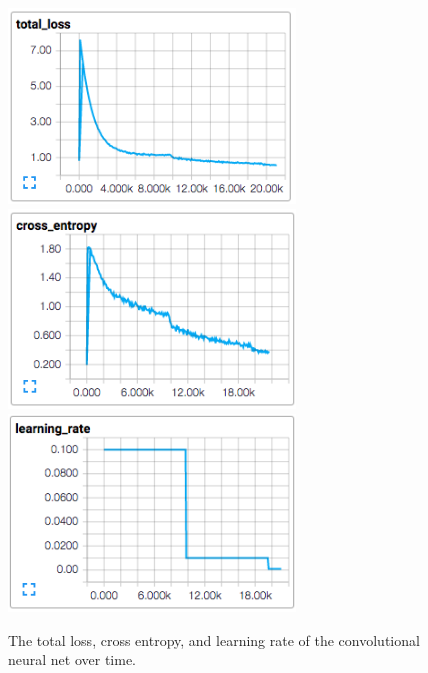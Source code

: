 \documentclass[11pt, twocolumn, twoside]{article}
\begin{document}
\begin{figure}
	\centering
	\includegraphics[width=3in]{total_loss}
	\includegraphics[width=3in]{cross_entropy}
	\includegraphics[width=3in]{learning_rate}
	\caption{The total loss, cross entropy, and learning rate of the convolutional neural net over time.}
	\label{fig:cnnloss}
\end{figure}
\end{document}
